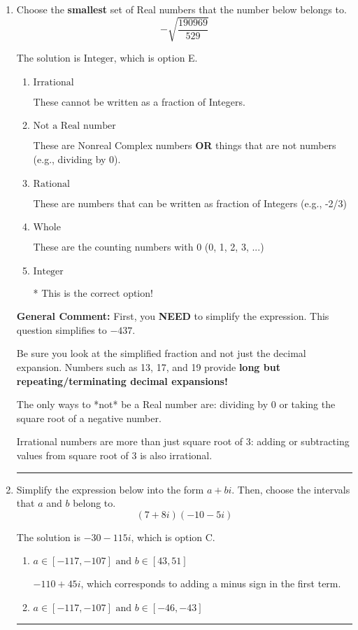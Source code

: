 \documentclass{extbook}[14pt]
\newcommand{\litem}[1]{\item #1

\rule{\textwidth}{0.4pt}}
\begin{document}
\begin{enumerate}\litem{
Choose the \textbf{smallest} set of Real numbers that the number below belongs to.
\[ -\sqrt{\frac{190969}{529}} \]

The solution is \( \text{Integer} \), which is option E.\begin{enumerate}[label=\Alph*.]
\item \( \text{Irrational} \)

These cannot be written as a fraction of Integers.
\item \( \text{Not a Real number} \)

These are Nonreal Complex numbers \textbf{OR} things that are not numbers (e.g., dividing by 0).
\item \( \text{Rational} \)

These are numbers that can be written as fraction of Integers (e.g., -2/3)
\item \( \text{Whole} \)

These are the counting numbers with 0 (0, 1, 2, 3, ...)
\item \( \text{Integer} \)

* This is the correct option!
\end{enumerate}

\textbf{General Comment:} First, you \textbf{NEED} to simplify the expression. This question simplifies to $-437$. 
 
 Be sure you look at the simplified fraction and not just the decimal expansion. Numbers such as 13, 17, and 19 provide \textbf{long but repeating/terminating decimal expansions!} 
 
 The only ways to *not* be a Real number are: dividing by 0 or taking the square root of a negative number. 
 
 Irrational numbers are more than just square root of 3: adding or subtracting values from square root of 3 is also irrational.
}
\litem{
Simplify the expression below into the form $a+bi$. Then, choose the intervals that $a$ and $b$ belong to.
\[ (7 + 8 i)(-10 - 5 i) \]

The solution is \( -30 - 115 i \), which is option C.\begin{enumerate}[label=\Alph*.]
\item \( a \in [-117, -107] \text{ and } b \in [43, 51] \)

 $-110 + 45 i$, which corresponds to adding a minus sign in the first term.
\item \( a \in [-117, -107] \text{ and } b \in [-46, -43] \)


\end{enumerate}}
\end{enumerate}
\end{document}
